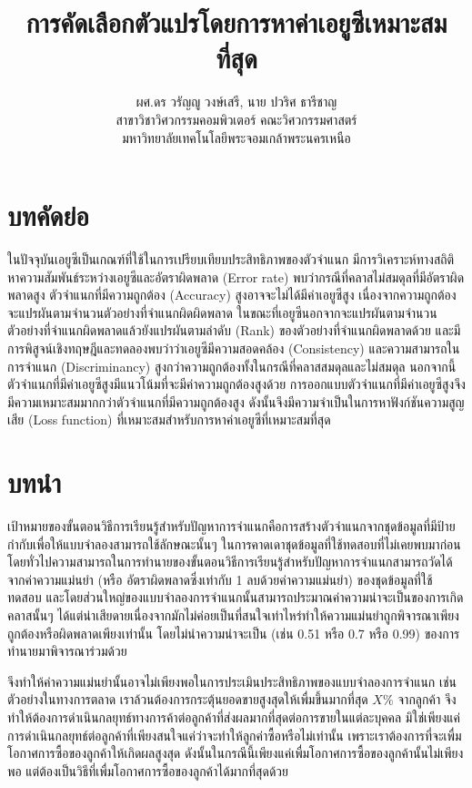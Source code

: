 \documentclass[twoside, twocolumn, 12pt]{article}
\title{การคัดเลือกตัวแปรโดยการหาค่าเอยูซีเหมาะสมที่สุด}
\author{%
\textsc{ผศ.ดร วรัญญู วงษ์เสรี, นาย ปวริศ ธารีชาญ}\\[1ex]
\normalsize สาขาวิชาวิศวกรรมคอมพิวเตอร์ คณะวิศวกรรมศาสตร์  \\ มหาวิทยาลัยเทคโนโลยีพระจอมเกล้าพระนครเหนือ %
}
\date{}
\begin{document}
\maketitle
\section*{บทคัดย่อ}
\quad ในปัจจุบันเอยูซีเป็นเกณฑ์ที่ใช้ในการเปรียบเทียบประสิทธิภาพของตัวจำแนก มีการวิเคราะห์ทางสถิติหาความสัมพันธ์ระหว่างเอยูซีและอัตราผิดพลาด (Error rate) พบว่ากรณีที่คลาสไม่สมดุลที่มีอัตราผิดพลาดสูง ตัวจำแนกที่มีความถูกต้อง (Accuracy) สูงอาจจะไม่ได้มีค่าเอยูซีสูง เนื่องจากความถูกต้องจะแปรผันตามจำนวนตัวอย่างที่จำแนกผิดผิดพลาด ในขณะที่เอยูซีนอกจากจะแปรผันตามจำนวนตัวอย่างที่จำแนกผิดพลาดแล้วยังแปรผันตามลำดับ (Rank) ของตัวอย่างที่จำแนกผิดพลาดด้วย และมีการพิสูจน์เชิงทฤษฎีและทดลองพบว่าว่าเอยูซีมีความสอดคล้อง (Consistency) และความสามารถในการจำแนก (Discriminancy) สูงกว่าความถูกต้องทั้งในกรณีที่คลาสสมดุลและไม่สมดุล นอกจากนี้ตัวจำแนกที่มีค่าเอยูซีสูงมีแนวโน้มที่จะมีค่าความถูกต้องสูงด้วย การออกแบบตัวจำแนกที่มีค่าเอยูซีสูงจึงมีความเหมาะสมมากกว่าตัวจำแนกที่มีความถูกต้องสูง ดังนั้นจึงมีความจำเป็นในการหาฟังก์ชันความสูญเสีย (Loss function) ที่เหมาะสมสำหรับการหาค่าเอยูซีที่เหมาะสมที่สุด
\section{บทนำ}
เป้าหมายของขั้นตอนวิธีการเรียนรู้สำหรับปัญหาการจำแนกคือการสร้างตัวจำแนกจากชุดข้อมูลที่มีป้ายกำกับเพื่อให้แบบจำลองสามารถใช้ลักษณะนั้นๆ ในการคาดเดาชุดข้อมูลที่ใช้ทดสอบที่ไม่เคยพบมาก่อน โดยทั่วไปความสามารถในการทำนายของขั้นตอนวิธีการเรียนรู้สำหรับปัญหาการจำแนกสามารถวัดได้จากค่าความแม่นยำ (หรือ อัตราผิดพลาดซึ่งเท่ากับ 1 ลบด้วยค่าความแม่นยำ) ของชุดข้อมูลที่ใช้ทดสอบ และโดยส่วนใหญ่ของแบบจำลองการจำแนกนั้นสามารถประมาณค่าความน่าจะเป็นของการเกิดคลาสนั้นๆ ได้แต่น่าเสียดายเนื่องจากมักไม่ค่อยเป็นที่สนใจเท่าไหร่ทำให้ความแม่นยำถูกพิจารณาเพียงถูกต้องหรือผิดพลาดเพียงเท่านั้น โดยไม่นำความน่าจะเป็น (เช่น 0.51 หรือ 0.7 หรือ 0.99) ของการทำนายมาพิจารณาร่วมด้วย

จึงทำให้ค่าความแม่นยำนั้นอาจไม่เพียงพอในการประเมินประสิทธิภาพของแบบจำลองการจำแนก เช่นตัวอย่างในทางการตลาด เราล้วนต้องการกระตุ้นยอดขายสูงสุดให้เพื่มขึ้นมากที่สุด $X\%$ จากลูกค้า จึงทำให้ต้องการดําเนินกลยุทธ์ทางการค้าต่อลูกค้าที่ส่งผลมากที่สุดต่อการขายในแต่ละบุคคล มิใช่เพียงแค่การดําเนินกลยุทธ์ต่อลูกค้าที่เพียงสนใจแค่ว่าจะทำให้ลูกค่าซื้อหรือไม่เท่านั้น เพราะเราต้องการที่จะเพื่มโอกาศการซื้อของลูกค้าให้เกิดผลสูงสุด ดังนั้นในกรณีนี้เพียงแค่เพื่มโอกาศการซื้อของลูกค้านั้นไม่เพียงพอ แต่ต้องเป็นวิธีที่เพื่มโอกาศการซื้อของลูกค้าได้มากที่สุดด้วย
\end{document}
